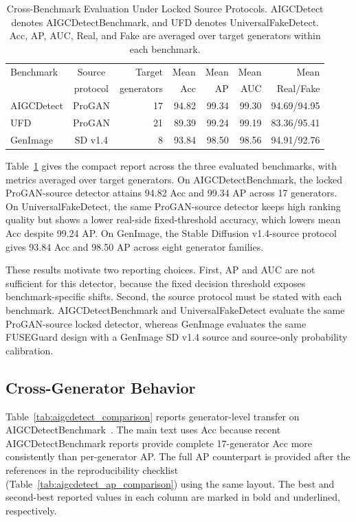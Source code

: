 \documentclass[lettersize,journal]{IEEEtran}
\begin{document}
\begin{table}[t]
\caption{Cross-Benchmark Evaluation Under Locked Source Protocols. AIGCDetect denotes AIGCDetectBenchmark, and UFD denotes UniversalFakeDetect. Acc, AP, AUC, Real, and Fake are averaged over target generators within each benchmark.}
\label{tab:benchmark_summary}
\centering
\small
\renewcommand{\arraystretch}{1.08}
\setlength{\tabcolsep}{2.4pt}
\begin{tabular}{@{}lcrrrrr@{}}
\toprule
Benchmark & Source & Target & Mean & Mean & Mean & Mean \\
 & protocol & generators & Acc & AP & AUC & Real/Fake \\
\midrule
AIGCDetect & ProGAN & 17 & 94.82 & 99.34 & 99.30 & 94.69/94.95 \\
UFD & ProGAN & 21 & 89.39 & 99.24 & 99.19 & 83.36/95.41 \\
GenImage & SD v1.4 & 8 & 93.84 & 98.50 & 98.56 & 94.91/92.76 \\
\bottomrule
\end{tabular}
\end{table}

Table~\ref{tab:benchmark_summary} gives the compact report across the three evaluated benchmarks, with metrics averaged over target generators. On AIGCDetectBenchmark, the locked ProGAN-source detector attains 94.82 Acc and 99.34 AP across 17 generators. On UniversalFakeDetect, the same ProGAN-source detector keeps high ranking quality but shows a lower real-side fixed-threshold accuracy, which lowers mean Acc despite 99.24 AP. On GenImage, the Stable Diffusion v1.4-source protocol gives 93.84 Acc and 98.50 AP across eight generator families.

These results motivate two reporting choices. First, AP and AUC are not sufficient for this detector, because the fixed decision threshold exposes benchmark-specific shifts. Second, the source protocol must be stated with each benchmark. AIGCDetectBenchmark and UniversalFakeDetect evaluate the same ProGAN-source locked detector, whereas GenImage evaluates the same FUSEGuard design with a GenImage SD v1.4 source and source-only probability calibration.

\subsection{Cross-Generator Behavior}
\label{sec:cross_generator_behavior}

Table~\ref{tab:aigcdetect_comparison} reports generator-level transfer on AIGCDetectBenchmark~\cite{zhong2023patchcraft}. The main text uses Acc because recent AIGCDetectBenchmark reports provide complete 17-generator Acc more consistently than per-generator AP. The full AP counterpart is provided after the references in the reproducibility checklist (Table~\ref{tab:aigcdetect_ap_comparison}) using the same layout. The best and second-best reported values in each column are marked in bold and underlined, respectively.
\end{document}
